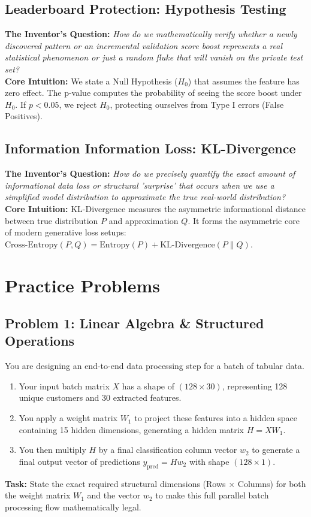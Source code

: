 \documentclass[12pt,a4paper]{article}
\begin{document}
\subsection{Leaderboard Protection: Hypothesis Testing}
\textbf{The Inventor's Question:} \textit{How do we mathematically verify whether a newly discovered pattern or an incremental validation score boost represents a real statistical phenomenon or just a random fluke that will vanish on the private test set?} \\
\textbf{Core Intuition:} We state a Null Hypothesis ($H_0$) that assumes the feature has zero effect. The p-value computes the probability of seeing the score boost under $H_0$. If $p < 0.05$, we reject $H_0$, protecting ourselves from Type I errors (False Positives).

\subsection{Information Information Loss: KL-Divergence}
\textbf{The Inventor's Question:} \textit{How do we precisely quantify the exact amount of informational data loss or structural 'surprise' that occurs when we use a simplified model distribution to approximate the true real-world distribution?} \\
\textbf{Core Intuition:} KL-Divergence measures the asymmetric informational distance between true distribution $P$ and approximation $Q$. It forms the asymmetric core of modern generative loss setups: $\text{Cross-Entropy}(P, Q) = \text{Entropy}(P) + \text{KL-Divergence}(P \| Q)$.

\section{Practice Problems}

\subsection*{Problem 1: Linear Algebra \& Structured Operations}
You are designing an end-to-end data processing step for a batch of tabular data.
\begin{enumerate}
    \item Your input batch matrix $X$ has a shape of $(128 \times 30)$, representing 128 unique customers and 30 extracted features.
    \item You apply a weight matrix $W_1$ to project these features into a hidden space containing 15 hidden dimensions, generating a hidden matrix $H = XW_1$.
    \item You then multiply $H$ by a final classification column vector $w_2$ to generate a final output vector of predictions $y_{\text{pred}} = Hw_2$ with shape $(128 \times 1)$.
\end{enumerate}
\textbf{Task:} State the exact required structural dimensions (Rows $\times$ Columns) for both the weight matrix $W_1$ and the vector $w_2$ to make this full parallel batch processing flow mathematically legal.
\end{document}
